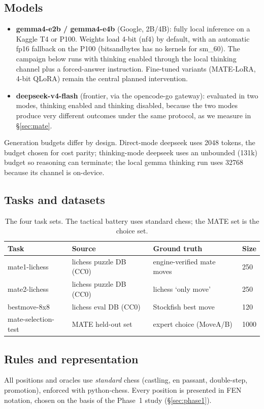 \documentclass{article}
\begin{document}
\subsection{Models}
\begin{itemize}
\item \textbf{gemma4-e2b / gemma4-e4b} (Google, 2B/4B): fully local
  inference on a Kaggle T4 or P100. Weights load 4-bit (nf4) by default,
  with an automatic fp16 fallback on the P100 (bitsandbytes has no
  kernels for sm\_60). The campaign below runs with thinking enabled
  through the local thinking channel plus a forced-answer instruction.
  Fine-tuned variants (MATE-LoRA, 4-bit QLoRA) remain the central
  planned intervention.
\item \textbf{deepseek-v4-flash} (frontier, via the opencode-go
  gateway): evaluated in two modes, thinking enabled and thinking
  disabled, because the two modes produce very different outcomes under
  the same protocol, as we measure in \S\ref{sec:mate}.
\end{itemize}
Generation budgets differ by design. Direct-mode deepseek uses 2048
tokens, the budget chosen for cost parity; thinking-mode deepseek uses an
unbounded (131k) budget so reasoning can terminate; the local gemma
thinking run uses 32768 because its channel is on-device.

\subsection{Tasks and datasets}
\begin{table}[h]
\centering
\begin{tabular}{llll}
\hline
Task & Source & Ground truth & Size \\ \hline
mate1-lichess & lichess puzzle DB (CC0) & engine-verified mate moves & 250 \\
mate2-lichess & lichess puzzle DB (CC0) & lichess `only move' & 250 \\
bestmove-8x8 & lichess eval DB (CC0) & Stockfish best move & 120 \\
mate-selection-test & MATE held-out set & expert choice (MoveA/B) & 1000 \\
\hline
\end{tabular}
\caption{The four task sets. The tactical battery uses standard chess;
the MATE set is the choice set.}
\label{tab:tasks}
\end{table}

\subsection{Rules and representation}
All positions and oracles use \emph{standard} chess (castling, en
passant, double-step, promotion), enforced with python-chess. Every
position is presented in FEN notation, chosen on the basis of the
Phase~1 study (\S\ref{sec:phase1}).
\end{document}
